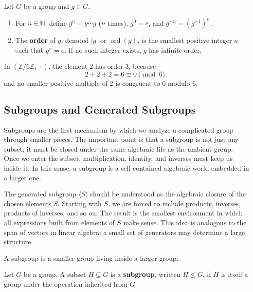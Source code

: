 \begin{definition}
Let $G$ be a group and $g\in G$.
\begin{enumerate}
    \item For $n\in\mathbb{N}$, define $g^n=g\cdots g$ ($n$ times), $g^0=e$, and $g^{-n}=(g^{-1})^n$.
    \item The \textbf{order} of $g$, denoted $|g|$ or $\operatorname{ord}(g)$, is the smallest positive integer $n$ such that $g^n=e$. If no such integer exists, $g$ has infinite order.
\end{enumerate}
\end{definition}

\begin{example}
In $(\mathbb{Z}/6\mathbb{Z},+)$, the element $2$ has order $3$, because
\[
    2+2+2=6\equiv 0\pmod 6,
\]
and no smaller positive multiple of $2$ is congruent to $0$ modulo $6$.
\end{example}

\subsection{Subgroups and Generated Subgroups}


Subgroups are the first mechanism by which we analyze a complicated group through smaller pieces. The important point is that a subgroup is not just any subset; it must be closed under the same algebraic life as the ambient group. Once we enter the subset, multiplication, identity, and inverses must keep us inside it. In this sense, a subgroup is a self-contained algebraic world embedded in a larger one.

The generated subgroup $\langle S\rangle$ should be understood as the algebraic closure of the chosen elements $S$. Starting with $S$, we are forced to include products, inverses, products of inverses, and so on. The result is the smallest environment in which all expressions built from elements of $S$ make sense. This idea is analogous to the span of vectors in linear algebra: a small set of generators may determine a large structure.

A subgroup is a smaller group living inside a larger group.

\begin{definition}[Subgroup]
Let $G$ be a group. A subset $H\subseteq G$ is a \textbf{subgroup}, written $H\leq G$, if $H$ is itself a group under the operation inherited from $G$.
\end{definition}

